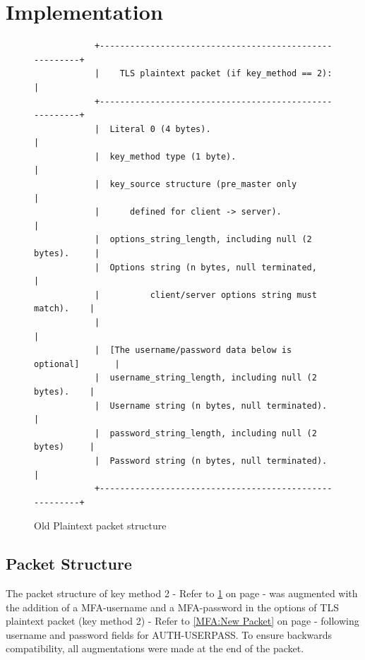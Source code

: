 \documentclass[11pt,oneside]{book}
\begin{document}
\section{Implementation}
\begin{figure}[t]
    \label{MFA:Old Packet}
    \begin{verbatim}
            +-------------------------------------------------------+
            |    TLS plaintext packet (if key_method == 2):         |
            +-------------------------------------------------------+
            |  Literal 0 (4 bytes).                                 |
            |  key_method type (1 byte).                            |
            |  key_source structure (pre_master only                |
            |      defined for client -> server).                   |
            |  options_string_length, including null (2 bytes).     |
            |  Options string (n bytes, null terminated,            |
            |          client/server options string must match).    |
            |                                                       |
            |  [The username/password data below is optional]       |
            |  username_string_length, including null (2 bytes).    |
            |  Username string (n bytes, null terminated).          |
            |  password_string_length, including null (2 bytes)     |
            |  Password string (n bytes, null terminated).          |
            +-------------------------------------------------------+
    \end{verbatim}
    \vspace{-10mm}
    \caption{Old Plaintext packet structure}
\end{figure}

\label{MFA:Implementation}
\subsection{Packet Structure}
The packet structure of key method 2 - Refer to \ref{MFA:Old Packet} on page \pageref{MFA:Old Packet} -
was augmented with the addition of a MFA-username and a MFA-password in the options of TLS plaintext
packet (key method 2) - Refer to \ref{MFA:New Packet} on page \pageref{MFA:New Packet} -
following username and password fields for AUTH-USERPASS. To ensure backwards
compatibility, all augmentations were made at the end of the packet.
\end{document}
